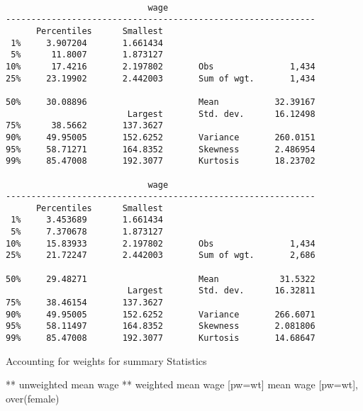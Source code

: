 \documentclass[
  letterpaper,
  DIV=11,
  numbers=noendperiod]{scrartcl}
\newenvironment{Shaded}{\begin{snugshade}}{\end{snugshade}}
\newcommand{\BaseNTok}[1]{\textcolor[rgb]{0.68,0.00,0.00}{#1}}
\newcommand{\KeywordTok}[1]{\textcolor[rgb]{0.00,0.23,0.31}{#1}}
\newcommand{\NormalTok}[1]{\textcolor[rgb]{0.00,0.23,0.31}{#1}}
\begin{document}
\begin{verbatim}

                            wage
-------------------------------------------------------------
      Percentiles      Smallest
 1%     3.907204       1.661434
 5%      11.8007       1.873127
10%      17.4216       2.197802       Obs               1,434
25%     23.19902       2.442003       Sum of wgt.       1,434

50%     30.08896                      Mean           32.39167
                        Largest       Std. dev.      16.12498
75%      38.5662       137.3627
90%     49.95005       152.6252       Variance       260.0151
95%     58.71271       164.8352       Skewness       2.486954
99%     85.47008       192.3077       Kurtosis       18.23702

                            wage
-------------------------------------------------------------
      Percentiles      Smallest
 1%     3.453689       1.661434
 5%     7.370678       1.873127
10%     15.83933       2.197802       Obs               1,434
25%     21.72247       2.442003       Sum of wgt.       2,686

50%     29.48271                      Mean            31.5322
                        Largest       Std. dev.      16.32811
75%     38.46154       137.3627
90%     49.95005       152.6252       Variance       266.6071
95%     58.11497       164.8352       Skewness       2.081806
99%     85.47008       192.3077       Kurtosis       14.68647
\end{verbatim}

Accounting for weights for summary Statistics

\begin{Shaded}
\begin{Highlighting}[]
\NormalTok{** unweighted}
\KeywordTok{mean}\NormalTok{ wage }
\NormalTok{** weighted}
\KeywordTok{mean}\NormalTok{ wage [pw=wt]}
\KeywordTok{mean}\NormalTok{ wage [pw=wt], }\BaseNTok{over}\NormalTok{(female)}
\end{Highlighting}
\end{Shaded}
\end{document}
